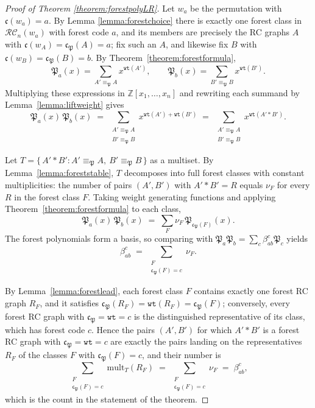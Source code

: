 \documentclass{amsart}
\theoremstyle{definition}
\theoremstyle{remark}
\numberwithin{equation}{subsection}
\newcommand{\wof}[1]{w_{#1}}
\newcommand{\wtt}{\mathtt{wt}}
\newcommand{\RC}{\mathcal{RC}}
\newcommand{\code}{\mathfrak{c}}
\newcommand{\forest}{\mathfrak{P}}
\begin{document}
\begin{proof}[Proof of Theorem \ref{theorem:forestpolyLR}]
Let $w_a$ be the permutation with $\code(w_a)=a$. By Lemma \ref{lemma:forestchoice} there is exactly one forest class in $\RC_n(w_a)$ with forest code $a$, and its members are precisely the RC graphs $A$ with $\code(\wof A)=\code_\forest(A)=a$; fix such an $A$, and likewise fix $B$ with $\code(\wof B)=\code_\forest(B)=b$. By Theorem~\ref{theorem:forestformula},
$$\forest_a(x) = \sum_{A'\equiv_\forest A} x^{\wtt(A')},\qquad \forest_b(x) = \sum_{B'\equiv_\forest B} x^{\wtt(B')}.$$
Multiplying these expressions in $\mathbb{Z}[x_1,\ldots,x_n]$ and rewriting each summand by Lemma~\ref{lemma:liftweight} gives
$$\forest_a(x)\,\forest_b(x) \;=\; \sum_{\substack{A'\equiv_\forest A\\ B'\equiv_\forest B}} x^{\wtt(A')+\wtt(B')}\;=\;\sum_{\substack{A'\equiv_\forest A\\ B'\equiv_\forest B}} x^{\wtt(A'*B')}.$$

Let $T = \{\,A'*B' : A'\equiv_\forest A,\ B'\equiv_\forest B\,\}$ as a multiset. By Lemma~\ref{lemma:foreststable}, $T$ decomposes into full forest classes with constant multiplicities: the number of pairs $(A',B')$ with $A'*B'=R$ equals $\nu_F$ for every $R$ in the forest class $F$. Taking weight generating functions and applying Theorem~\ref{theorem:forestformula} to each class,
$$\forest_a(x)\,\forest_b(x)\;=\;\sum_{F}\nu_F\,\forest_{\code_\forest(F)}(x).$$
The forest polynomials form a basis, so comparing with $\forest_a\forest_b=\sum_c\beta_{ab}^c\forest_c$ yields
$$\beta_{ab}^c\;=\;\sum_{\substack{F\\ \code_\forest(F)=c}}\nu_F.$$

By Lemma~\ref{lemma:forestlead}, each forest class $F$ contains exactly one forest RC graph $R_F$, and it satisfies $\code_\forest(R_F)=\wtt(R_F)=\code_\forest(F)$; conversely, every forest RC graph with $\code_\forest=\wtt=c$ is the distinguished representative of its class, which has forest code $c$. Hence the pairs $(A',B')$ for which $A'*B'$ is a forest RC graph with $\code_\forest=\wtt=c$ are exactly the pairs landing on the representatives $R_F$ of the classes $F$ with $\code_\forest(F)=c$, and their number is
$$\sum_{\substack{F\\ \code_\forest(F)=c}}\mathrm{mult}_T(R_F)\;=\;\sum_{\substack{F\\ \code_\forest(F)=c}}\nu_F\;=\;\beta_{ab}^c,$$
which is the count in the statement of the theorem.
\end{proof}
\end{document}
